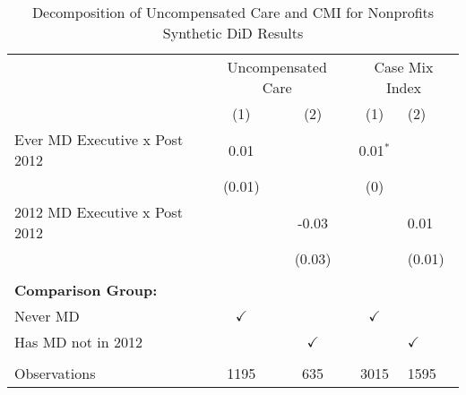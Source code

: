 \begin{table}[ht!]

\caption{\label{tab:MD_noMD_uncompCMI_decomp_synth}Decomposition of Uncompensated Care and CMI for Nonprofits Synthetic DiD Results}
\centering
\begin{tabular}[t]{lcccl}
\toprule
\multicolumn{1}{c}{ } & \multicolumn{2}{c}{Uncompensated Care} & \multicolumn{2}{c}{Case Mix Index} \\
\cmidrule(l{3pt}r{3pt}){2-3} \cmidrule(l{3pt}r{3pt}){4-5}
 & (1) & (2) & (1) & (2)\\
\midrule
Ever MD Executive x Post 2012 & 0.01 &  & 0.01$^{*}$ & \\
 & (0.01) &  & (0) & \\
2012 MD Executive x Post 2012 &  & -0.03 &  & 0.01\\
 &  & (0.03) &  & (0.01)\\
 &  &  &  \vphantom{1} & \\
\addlinespace
\textbf{Comparison Group:} &  &  &  & \\
Never MD & $\checkmark$ &  & $\checkmark$ & \\
Has MD not in 2012 &  & $\checkmark$ &  & $\checkmark$\\
 &  &  &  & \\
Observations & 1195 & 635 & 3015 & 1595\\
\bottomrule
\end{tabular}
\end{table}
